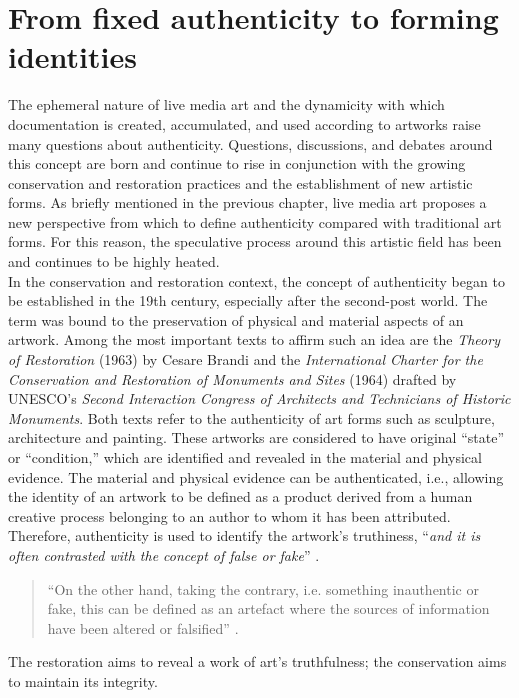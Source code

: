 \section{From fixed authenticity to forming identities}
The ephemeral nature of live media art and the dynamicity with which documentation is created, accumulated, and used according to artworks raise many questions about authenticity. Questions, discussions, and debates around this concept are born and continue to rise in conjunction with the growing conservation and restoration practices and the establishment of new artistic forms. As briefly mentioned in the previous chapter, live media art proposes a new perspective from which to define authenticity compared with traditional art forms. For this reason, the speculative process around this artistic field has been and continues to be highly heated.\\
In the conservation and restoration context, the concept of authenticity began to be established in the 19th century, especially after the second-post world. The term was bound to the preservation of physical and material aspects of an artwork. Among the most important texts to affirm such an idea are the \textit{Theory of Restoration} (1963) by Cesare Brandi \cite{Brandi2005theory} and the \textit{International Charter for the Conservation and Restoration of Monuments and Sites} (1964) \cite{venicecharter1964} drafted by UNESCO’s \textit{Second Interaction Congress of Architects and Technicians of Historic Monuments}. Both texts refer to the authenticity of art forms such as sculpture, architecture and painting. These artworks are considered to have original ``state'' or ``condition,'' which are identified and revealed in the material and physical evidence. The material and physical evidence can be authenticated, i.e., allowing the identity of an artwork to be defined as a product derived from a human creative process belonging to an author to whom it has been attributed. Therefore, authenticity is used to identify the artwork’s truthiness, ``\textit{and it is often contrasted with the concept of false or fake}'' \cite{jokilehto2010conservation}.
\begin{quote}
    “On the other hand, taking the contrary, i.e. something inauthentic or fake, this can be defined as an artefact where the sources of information have been altered or falsified” \cite{jokilehto2010conservation}.
\end{quote}
The restoration aims to reveal a work of art’s truthfulness; the conservation aims to maintain its integrity. 
